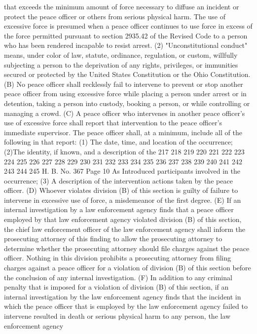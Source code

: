 that exceeds the minimum amount of force necessary to diffuse an
incident or protect the peace officer or others from serious
physical harm. The use of excessive force is presumed when a
peace officer continues to use force in excess of the force
permitted pursuant to section 2935.42 of the Revised Code to a
person who has been rendered incapable to resist arrest.
(2) "Unconstitutional conduct" means, under color of law,
statute, ordinance, regulation, or custom, willfully subjecting
a person to the deprivation of any rights, privileges, or
immunities secured or protected by the United States
Constitution or the Ohio Constitution.
(B) No peace officer shall recklessly fail to intervene to
prevent or stop another peace officer from using excessive force
while placing a person under arrest or in detention, taking a
person into custody, booking a person, or while controlling or
managing a crowd.
 (C) A peace officer who intervenes in another peace
officer's use of excessive force shall report that intervention
to the peace officer's immediate supervisor. The peace officer
shall, at a minimum, include all of the following in that
report:
 (1) The date, time, and location of the occurrence;
 (2)The identity, if known, and a description of the
217
218
219
220
221
222
223
224
225
226
227
228
229
230
231
232
233
234
235
236
237
238
239
240
241
242
243
244
245
H. B. No. 367 Page 10
As Introduced
participants involved in the occurrence;
 (3) A description of the intervention actions taken by the
peace officer.
(D) Whoever violates division (B) of this section is
guilty of failure to intervene in excessive use of force, a
misdemeanor of the first degree.
(E) If an internal investigation by a law enforcement
agency finds that a peace officer employed by that law
enforcement agency violated division (B) of this section, the
chief law enforcement officer of the law enforcement agency
shall inform the prosecuting attorney of this finding to allow
the prosecuting attorney to determine whether the prosecuting
attorney should file charges against the peace officer. Nothing
in this division prohibits a prosecuting attorney from filing
charges against a peace officer for a violation of division (B)
of this section before the conclusion of any internal
investigation.
(F) In addition to any criminal penalty that is imposed
for a violation of division (B) of this section, if an internal
investigation by the law enforcement agency finds that the
incident in which the peace officer that is employed by the law
enforcement agency failed to intervene resulted in death or
serious physical harm to any person, the law enforcement agency
